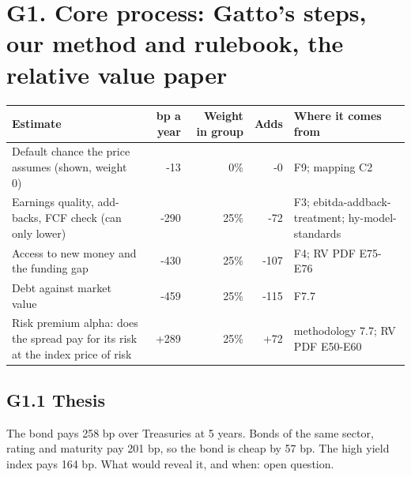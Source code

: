 \documentclass[11pt,a4paper]{article}
\begin{document}
\section*{G1. Core process: Gatto's steps, our method and rulebook, the relative value paper}
\par\noindent{}
\begin{center}\footnotesize\setlength{\tabcolsep}{3.5pt}\begin{tabular}{@{}p{6.2cm}rrrp{4.2cm}@{}}\toprule
Estimate & bp a year & Weight in group & Adds & Where it comes from \\\midrule
Default chance the price assumes (shown, weight 0) & -13 & 0\% & -0 & F9; mapping C2 \\
Earnings quality, add-backs, FCF check (can only lower) & -290 & 25\% & -72 & F3; ebitda-addback-treatment; hy-model-standards \\
Access to new money and the funding gap & -430 & 25\% & -107 & F4; RV PDF E75-E76 \\
Debt against market value & -459 & 25\% & -115 & F7.7 \\
Risk premium alpha: does the spread pay for its risk at the index price of risk & +289 & 25\% & +72 & methodology 7.7; RV PDF E50-E60 \\
\bottomrule\end{tabular}\end{center}
\subsection*{G1.1 Thesis}
The bond pays 258 bp over Treasuries at 5 years. Bonds of the same sector, rating and maturity pay 201 bp, so the bond is cheap by 57 bp. The high yield index pays 164 bp. What would reveal it, and when: open question.
\end{document}
